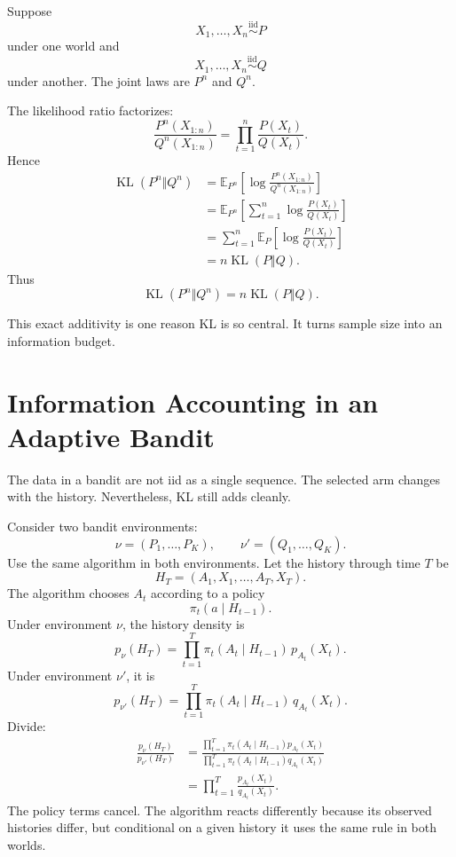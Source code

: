 \documentclass[en,nofont,11pt]{elegantbook}
\newcommand{\E}{\mathbb{E}}
\newcommand{\KL}{\operatorname{KL}}
\begin{document}
Suppose
\[
X_1,\ldots,X_n\overset{\mathrm{iid}}{\sim}P
\]
under one world and
\[
X_1,\ldots,X_n\overset{\mathrm{iid}}{\sim}Q
\]
under another. The joint laws are $P^n$ and $Q^n$.

The likelihood ratio factorizes:
\[
\frac{P^n(X_{1:n})}{Q^n(X_{1:n})}
=
\prod_{t=1}^{n}\frac{P(X_t)}{Q(X_t)}.
\]
Hence
\begin{align*}
\KL(P^n\Vert Q^n)
&=
\E_{P^n}\left[
\log\frac{P^n(X_{1:n})}{Q^n(X_{1:n})}
\right]\\
&=
\E_{P^n}\left[
\sum_{t=1}^{n}\log\frac{P(X_t)}{Q(X_t)}
\right]\\
&=
\sum_{t=1}^{n}
\E_P\left[
\log\frac{P(X_t)}{Q(X_t)}
\right]\\
&=
n\KL(P\Vert Q).
\end{align*}
Thus
\[
\boxed{\KL(P^n\Vert Q^n)=n\KL(P\Vert Q).}
\]

This exact additivity is one reason KL is so central. It turns sample size into an information budget.

\chapter{Information Accounting in an Adaptive Bandit}

The data in a bandit are not iid as a single sequence. The selected arm changes with the history. Nevertheless, KL still adds cleanly.

Consider two bandit environments:
\[
\nu=(P_1,\ldots,P_K),
\qquad
\nu'=(Q_1,\ldots,Q_K).
\]
Use the same algorithm in both environments. Let the history through time $T$ be
\[
H_T=(A_1,X_1,\ldots,A_T,X_T).
\]
The algorithm chooses $A_t$ according to a policy
\[
\pi_t(a\mid H_{t-1}).
\]
Under environment $\nu$, the history density is
\[
p_\nu(H_T)
=
\prod_{t=1}^{T}
\pi_t(A_t\mid H_{t-1})
\,p_{A_t}(X_t).
\]
Under environment $\nu'$, it is
\[
p_{\nu'}(H_T)
=
\prod_{t=1}^{T}
\pi_t(A_t\mid H_{t-1})
\,q_{A_t}(X_t).
\]
Divide:
\begin{align*}
\frac{p_\nu(H_T)}{p_{\nu'}(H_T)}
&=
\frac{
\prod_{t=1}^{T}
\pi_t(A_t\mid H_{t-1})p_{A_t}(X_t)
}{
\prod_{t=1}^{T}
\pi_t(A_t\mid H_{t-1})q_{A_t}(X_t)
}\\
&=
\prod_{t=1}^{T}
\frac{p_{A_t}(X_t)}{q_{A_t}(X_t)}.
\end{align*}
The policy terms cancel. The algorithm reacts differently because its observed histories differ, but conditional on a given history it uses the same rule in both worlds.
\end{document}
